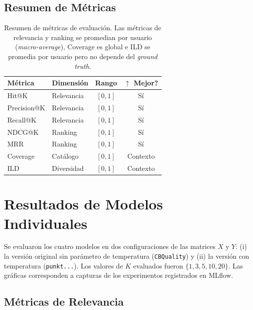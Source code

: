 \documentclass[11pt, a4paper]{article}
\begin{document}
\subsection{Resumen de Métricas}

\begin{table}[H]\centering
\begin{tabular}{llcc}
\toprule
\textbf{Métrica} & \textbf{Dimensión} & \textbf{Rango} & $\uparrow$ \textbf{Mejor?} \\
\midrule
Hit@K       & Relevancia  & $[0,1]$ & Sí \\
Precision@K & Relevancia  & $[0,1]$ & Sí \\
Recall@K    & Relevancia  & $[0,1]$ & Sí \\
NDCG@K      & Ranking     & $[0,1]$ & Sí \\
MRR         & Ranking     & $[0,1]$ & Sí \\
Coverage    & Catálogo    & $[0,1]$ & Contexto \\
ILD         & Diversidad  & $[0,1]$ & Contexto \\
\bottomrule
\end{tabular}
\caption{Resumen de métricas de evaluación. Las métricas de relevancia y ranking se promedian por usuario (\textit{macro-average}), Coverage es global e ILD se promedia por usuario pero no depende del \textit{ground truth}.}
\label{tab:metricas}
\end{table}


\section{Resultados de Modelos Individuales}
\label{sec:resultados}

Se evaluaron los cuatro modelos en dos configuraciones de las matrices $X$ y $Y$: (i) la versión original sin parámetro de temperatura (\texttt{CBQuality}) y (ii) la versión con temperatura (\texttt{punkt...}). Los valores de $K$ evaluados fueron $\{1, 3, 5, 10, 20\}$. Las gráficas corresponden a capturas de los experimentos registrados en MLflow.

\subsection{Métricas de Relevancia}
\end{document}
